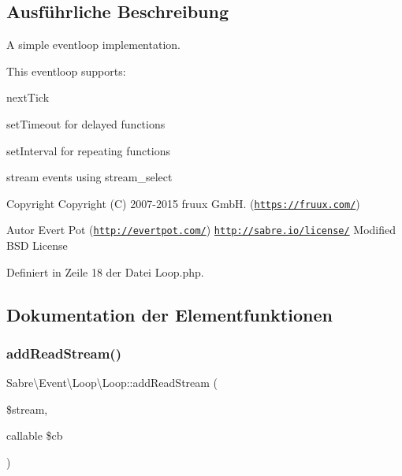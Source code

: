 \subsection{Ausführliche Beschreibung}
A simple eventloop implementation.

This eventloop supports\+:
\begin{DoxyItemize}
\item next\+Tick
\item set\+Timeout for delayed functions
\item set\+Interval for repeating functions
\item stream events using stream\+\_\+select
\end{DoxyItemize}

\begin{DoxyCopyright}{Copyright}
Copyright (C) 2007-\/2015 fruux GmbH. (\href{https://fruux.com/}{\tt https\+://fruux.\+com/}) 
\end{DoxyCopyright}
\begin{DoxyAuthor}{Autor}
Evert Pot (\href{http://evertpot.com/}{\tt http\+://evertpot.\+com/})  \href{http://sabre.io/license/}{\tt http\+://sabre.\+io/license/} Modified B\+SD License 
\end{DoxyAuthor}


Definiert in Zeile 18 der Datei Loop.\+php.



\subsection{Dokumentation der Elementfunktionen}
\mbox{\label{class_sabre_1_1_event_1_1_loop_1_1_loop_af2a360be696de46a5685a0b4a3d754aa}} 
\subsubsection{\texorpdfstring{add\+Read\+Stream()}{addReadStream()}}
{\footnotesize\ttfamily Sabre\textbackslash{}\+Event\textbackslash{}\+Loop\textbackslash{}\+Loop\+::add\+Read\+Stream (\begin{DoxyParamCaption}\item[{}]{\$stream,  }\item[{callable}]{\$cb }\end{DoxyParamCaption})}

